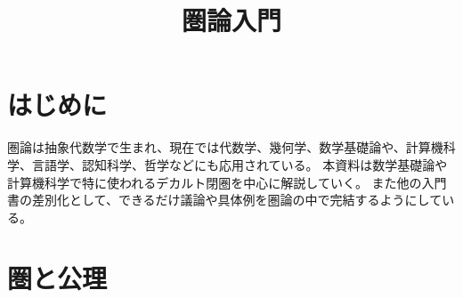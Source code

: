 \documentclass[dvipdfmx]{jsarticle}
\numberwithin{proof}{subsection}
\numberwithin{prop}{subsection}
\numberwithin{define}{subsection}
\begin{document}
	\title{圏論入門}
	\maketitle
	\tableofcontents
	\section{はじめに}
	圏論は抽象代数学で生まれ、現在では代数学、幾何学、数学基礎論や、計算機科学、言語学、認知科学、哲学などにも応用されている。
	本資料は数学基礎論や計算機科学で特に使われるデカルト閉圏を中心に解説していく。
	また他の入門書の差別化として、できるだけ議論や具体例を圏論の中で完結するようにしている。
	\section{圏と公理}
\end{document}
